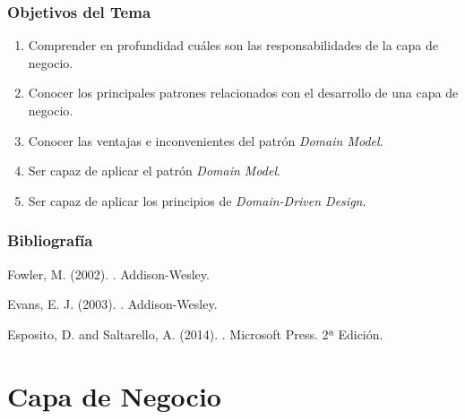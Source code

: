 \documentclass[handout,a4paper,slidestop,xcolor=pst,blue]{beamer}
\begin{document}
\begin{frame}[c]
    \frametitle{Objetivos del Tema}
    \begin{enumerate}[<+->]
         \item Comprender en profundidad cuáles son las responsabilidades de la capa de negocio.
         \item Conocer los principales patrones relacionados con el desarrollo de una capa de negocio.
         \item Conocer las ventajas e inconvenientes del patrón \emph{Domain Model}.
         \item Ser capaz de aplicar el patrón \emph{Domain Model}.
         \item Ser capaz de aplicar los principios de \emph{Domain-Driven Design}.
    \end{enumerate}
\end{frame}

\begin{frame}[c]
    \frametitle{Bibliografía}
    \begin{thebibliography}{1}

        Fowler, M. (2002).
        .
        \newblock Addison-Wesley.

        Evans, E. J. (2003).
        .
        \newblock Addison-Wesley.

        Esposito, D. and Saltarello, A. (2014).
        . 
        \newblock Microsoft Press. 2ª Edición.

    \end{thebibliography}
\end{frame}

\section{Capa de Negocio}
\end{document}
